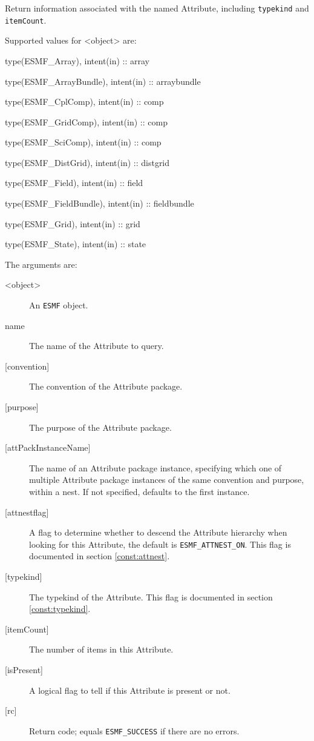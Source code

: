    Return information associated with the named Attribute,
   including {\tt typekind} and {\tt itemCount}.
  
   Supported values for <object> are:
   \begin{description}
   \item type(ESMF\_Array), intent(in) :: array
   \item type(ESMF\_ArrayBundle), intent(in) :: arraybundle
   \item type(ESMF\_CplComp), intent(in) :: comp
   \item type(ESMF\_GridComp), intent(in) :: comp
   \item type(ESMF\_SciComp), intent(in) :: comp
   \item type(ESMF\_DistGrid), intent(in) :: distgrid
   \item type(ESMF\_Field), intent(in) :: field
   \item type(ESMF\_FieldBundle), intent(in) :: fieldbundle
   \item type(ESMF\_Grid), intent(in) :: grid
   \item type(ESMF\_State), intent(in) :: state
   \end{description}
  
   The arguments are:
   \begin{description}
   \item [<object>]
   An {\tt ESMF} object.
   \item [name]
   The name of the Attribute to query.
   \item [{[convention]}]
   The convention of the Attribute package.
   \item [{[purpose]}]
   The purpose of the Attribute package.
   \item [{[attPackInstanceName]}]
   The name of an Attribute package instance, specifying which one
   of multiple Attribute package instances of the same convention
   and purpose, within a nest. If not specified, defaults to the
   first instance.
   \item [{[attnestflag]}]
   A flag to determine whether to descend the
   Attribute hierarchy when looking for this Attribute, the default
   is {\tt ESMF\_ATTNEST\_ON}. This flag is documented in section
   \ref{const:attnest}.
   \item [{[typekind]}]
   The typekind of the Attribute. This flag is documented in section
   \ref{const:typekind}.
   \item [{[itemCount]}]
   The number of items in this Attribute.
   \item [{[isPresent]}]
   A logical flag to tell if this Attribute is present or not.
   \item [{[rc]}]
   Return code; equals {\tt ESMF\_SUCCESS} if there are no errors.
   \end{description}
  
